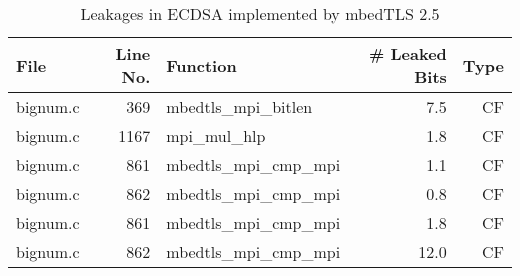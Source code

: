 \begin{table}[!ht]
\centering\tiny\scriptsize
\caption{Leakages in ECDSA implemented by mbedTLS 2.5}\label{tab:t_ECDSALibgcrypt2.5-nonce}
\begin{tabular}{lrlrr}
\hline
\textbf{File} & \textbf{Line No.} & \textbf{Function} & \textbf{\# Leaked Bits} & \textbf{Type} \\\hline
bignum.c& 369&mbedtls\_mpi\_bitlen&7.5 &CF\\
bignum.c& 1167&mpi\_mul\_hlp&1.8 &CF\\
bignum.c& 861&mbedtls\_mpi\_cmp\_mpi&1.1 &CF\\
bignum.c& 862&mbedtls\_mpi\_cmp\_mpi&0.8 &CF\\
bignum.c& 861&mbedtls\_mpi\_cmp\_mpi&1.8 &CF\\
bignum.c& 862&mbedtls\_mpi\_cmp\_mpi&12.0 &CF\\
\hline
\end{tabular}
\renewcommand{\baselinestretch}{1.0}\selectfont
\end{table}
